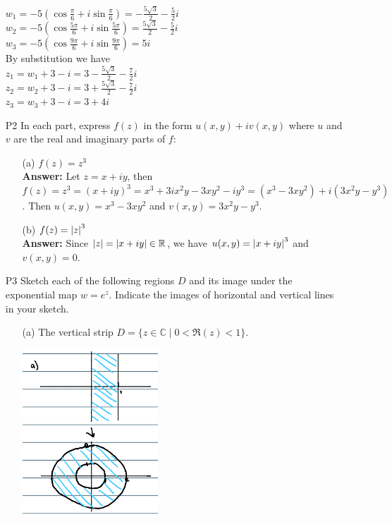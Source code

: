 \documentclass{article}
\begin{document}
\begin{itemize}
          $w_1=-5(\cos\frac{\pi}{6}+i\sin\frac{\pi}{6})=-\frac{5\sqrt{3}}{2}-\frac{5}{2}i$\\
          $w_2=-5(\cos\frac{5\pi}{6}+i\sin\frac{5\pi}{6})=\frac{5\sqrt{3}}{2}-\frac{5}{2}i$\\
          $w_3=-5(\cos\frac{9\pi}{6}+i\sin\frac{9\pi}{6})=5i$\\
          By substitution we have\\
          $z_1=w_1+3-i=3-\frac{5\sqrt{3}}{2}-\frac{7}{2}i$\\
          $z_2=w_2+3-i=3+\frac{5\sqrt{3}}{2}-\frac{7}{2}i$\\
          $z_3=w_3+3-i=3+4i$
    \item [P2] In each part, express $f(z)$ in the form $u(x,y)+iv(x,y)$ where $u$ and $v$ are the real and imaginary parts of $f$:
          \begin{itemize}
              \item [(a)] $f(z)=z^3$\\
                    \textbf{Answer: } Let $z=x+iy$, then $f(z)=z^3=(x+iy)^3=x^3+3ix^2y-3xy^2-iy^3=(x^3-3xy^2)+i(3x^2y-y^3)$. Then $u(x,y)=x^3-3xy^2$ and $v(x,y)=3x^2y-y^3$.
              \item [(b)] $f(z)=\abs{z}^3$\\
                    \textbf{Answer: } Since $\abs{z}=\abs{x+iy}\in\mathbb{R}$, we have $u(x,y)=\abs{x+iy}^3$ and $v(x,y)=0$.
          \end{itemize}
    \item [P3] Sketch each of the following regions $D$ and its image under the exponential map $w=e^z$. Indicate the images of horizontal and vertical lines in your sketch.\begin{itemize}
              \item [(a)] The vertical strip $D=\{z\in\mathbb{C}\mid 0<\Re(z)<1\}$.\\
                    \begin{center}
                        \includegraphics[width=2in]{p2a.png}

\end{center}
\end{itemize}
\end{itemize}
\end{document}
